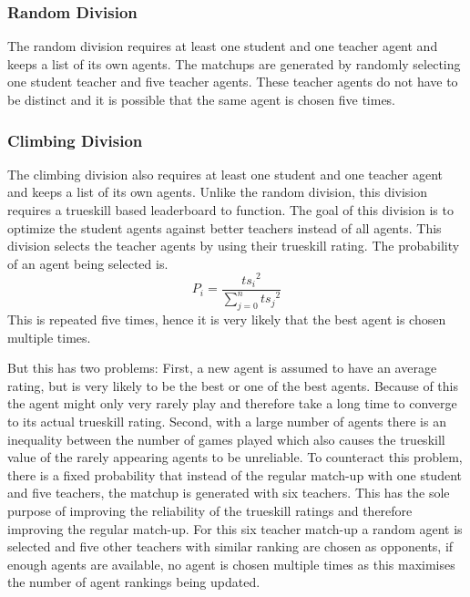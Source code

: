 \subsubsection{Random Division}
The random division requires at least one student and one teacher agent and keeps a list of its own agents. The matchups are generated by randomly selecting one student teacher and five teacher agents. These teacher agents do not have to be distinct and it is possible that the same agent is chosen five times.

\subsubsection{Climbing Division}
The climbing division also requires at least one student and one teacher agent and keeps a list of its own agents. Unlike the random division, this division requires a trueskill based leaderboard to function. The goal of this division is to optimize the student agents against better teachers instead of all agents. This division selects the teacher agents by using their trueskill rating. The probability of an agent being selected is.
\begin{equation}
  P_i = \frac{{ts_i}^2}{\sum_{j=0}^{n} {ts_j}^2}
\end{equation}
This is repeated five times, hence it is very likely that the best agent is chosen multiple times.

But this has two problems:
First, a new agent is assumed to have an average rating, but is very likely to be the best or one of the best agents. Because of this the agent might only very rarely play and therefore take a long time to converge to its actual trueskill rating. Second, with a large number of agents there is an inequality between the number of games played which also causes the trueskill value of the rarely appearing agents to be unreliable.
To counteract this problem, there is a fixed probability that instead of the regular match-up with one student and five teachers, the matchup is generated with six teachers. This has the sole purpose of improving the reliability of the trueskill ratings and therefore improving the regular match-up. For this six teacher match-up a random agent is selected and five other teachers with similar ranking are chosen as opponents, if enough agents are available, no agent is chosen multiple times as this maximises the number of agent rankings being updated.

